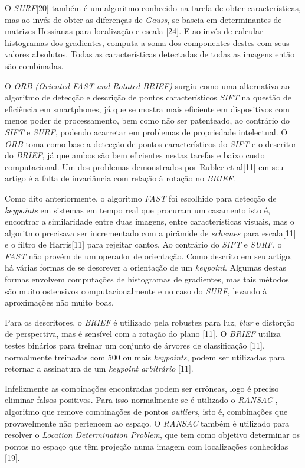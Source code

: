 O \textit{SURF}[20] também é um algoritmo conhecido na tarefa de obter características, mas ao invés de obter as diferenças de \textit{Gauss}, se baseia em determinantes de matrizes Hessianas para localização e escala [24]. E ao invés de calcular histogramas dos gradientes, computa a soma dos componentes destes com seus valores absolutos. Todas as características detectadas de todas as imagens então são combinadas.

O \textit{ORB (Oriented FAST and Rotated BRIEF)} surgiu como uma alternativa ao algoritmo de detecção e descrição de pontos característicos \textit{SIFT} na questão de eficiência em smartphones, já que se mostra mais eficiente em dispositivos com menos poder de processamento, bem como não ser patenteado, ao contrário do \textit{SIFT} e \textit{SURF}, podendo acarretar em problemas de propriedade intelectual. O \textit{ORB} toma como base a detecção de pontos característicos do \textit{SIFT} e o descritor do \textit{BRIEF}, já que ambos são bem eficientes nestas tarefas e baixo custo computacional. Um dos problemas demonstrados por Rublee et al[11] em seu artigo é a falta de invariância com relação à rotação no \textit{BRIEF}.

Como dito anteriormente, o algoritmo \textit{FAST} foi escolhido para detecção de \textit{keypoints} em sistemas em tempo real que procuram um casamento isto é, encontrar a similaridade entre duas imagens, entre características visuais, mas o algoritmo precisava ser incrementado com a pirâmide de \textit{schemes} para escala[11] e o filtro de Harris[11] para rejeitar cantos. Ao contrário do \textit{SIFT} e \textit{SURF}, o \textit{FAST} não provém de um operador de orientação. Como descrito em seu artigo, há várias formas de se descrever a orientação de um \textit{keypoint}. Algumas destas formas envolvem computações de histogramas de gradientes, mas tais métodos são muito ostensivos computacionalmente e no caso do \textit{SURF}, levando à aproximações não muito boas.

Para os descritores, o \textit{BRIEF} é utilizado pela robustez para luz, \textit{blur} e distorção de perspectiva, mas é sensível com a rotação do plano [11]. O \textit{BRIEF} utiliza testes binários para treinar um conjunto de árvores de classificação [11], normalmente treinadas com 500 ou mais \textit{keypoints}, podem ser utilizadas para retornar a assinatura de um \textit{keypoint arbitrário} [11].

Infelizmente as combinações encontradas podem ser errôneas, logo é preciso eliminar falsos positivos. Para isso normalmente se é utilizado o \textit{RANSAC} , algoritmo que remove combinações de pontos \textit{outliers}, isto é, combinações que provavelmente não pertencem ao espaço. O \textit{RANSAC} também é utilizado para resolver o \textit{Location Determination Problem}, que tem como objetivo determinar os pontos no espaço que têm projeção numa imagem com localizações conhecidas [19].

